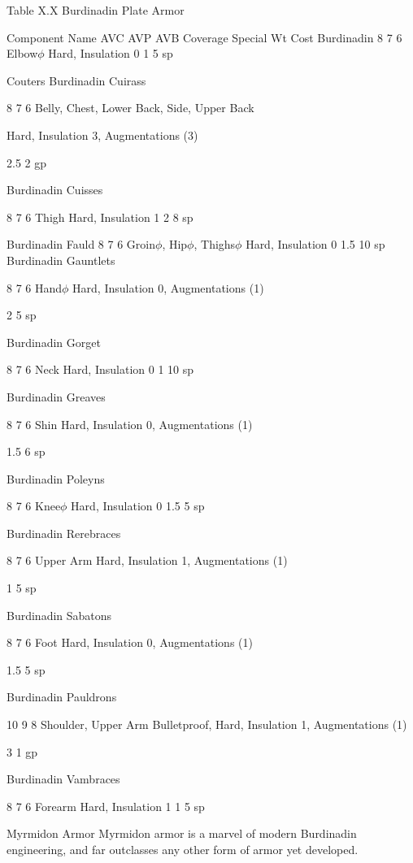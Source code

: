 \documentclass[oneside,11pt,english]{book}
\begin{document}
 
Table X.X Burdinadin Plate Armor 

 

Component Name AVC AVP AVB Coverage Special Wt Cost 
Burdinadin 8 7 6 Elbow$\phi$ Hard, Insulation 0 1 5 sp 


Couters 
Burdinadin 
Cuirass 

8 7 6 Belly, Chest, Lower Back, 
Side, Upper Back 

Hard, Insulation 3, Augmentations 
(3) 

2.5 2 gp 

Burdinadin 
Cuisses 

8 7 6 Thigh Hard, Insulation 1 2 8 sp 

Burdinadin Fauld 8 7 6 Groin$\phi$, Hip$\phi$, Thighs$\phi$ Hard, Insulation 0 1.5 10 
sp 
Burdinadin 
Gauntlets 

8 7 6 Hand$\phi$ Hard, Insulation 0, Augmentations 
(1) 

2 5 sp 

Burdinadin 
Gorget 

8 7 6 Neck Hard, Insulation 0 1 10 
sp 

Burdinadin 
Greaves 

8 7 6 Shin Hard, Insulation 0, Augmentations 
(1) 

1.5 6 sp 

Burdinadin 
Poleyns 

8 7 6 Knee$\phi$ Hard, Insulation 0 1.5 5 sp 

Burdinadin 
Rerebraces 

8 7 6 Upper Arm Hard, Insulation 1, Augmentations 
(1) 

1 5 sp 

Burdinadin 
Sabatons 

8 7 6 Foot Hard, Insulation 0, Augmentations 
(1) 

1.5 5 sp 

Burdinadin 
Pauldrons 

10 9 8 Shoulder, Upper Arm Bulletproof, Hard, Insulation 1, 
Augmentations (1) 

3 1 gp 

Burdinadin 
Vambraces 

8 7 6 Forearm Hard, Insulation 1 1 5 sp 

 

 

Myrmidon Armor 
Myrmidon armor is a marvel of modern Burdinadin engineering, and far outclasses any other form of 
armor yet developed. 

 
\end{document}
